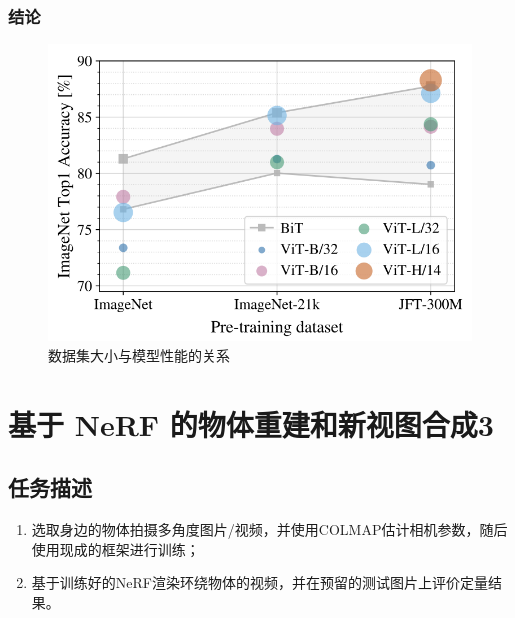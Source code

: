 \documentclass[notitlepage,cs4size,punct,oneside]{ctexrep}
\numberwithin{equation}{chapter}
\theoremstyle{mystyle}
\begin{document}
\subsection{结论}
\begin{figure}[H]
    \centering
    \includegraphics[scale=0.75]{ViT_vs_CNN.png}
    \caption{数据集大小与模型性能的关系}
\end{figure}

\chapter{基于 NeRF 的物体重建和新视图合成3}
\section{任务描述}
\begin{enumerate}
\item 选取身边的物体拍摄多角度图片/视频，并使用COLMAP估计相机参数，随后使用现成的框架进行训练；
\item 基于训练好的NeRF渲染环绕物体的视频，并在预留的测试图片上评价定量结果。
\end{enumerate}
\end{document}
